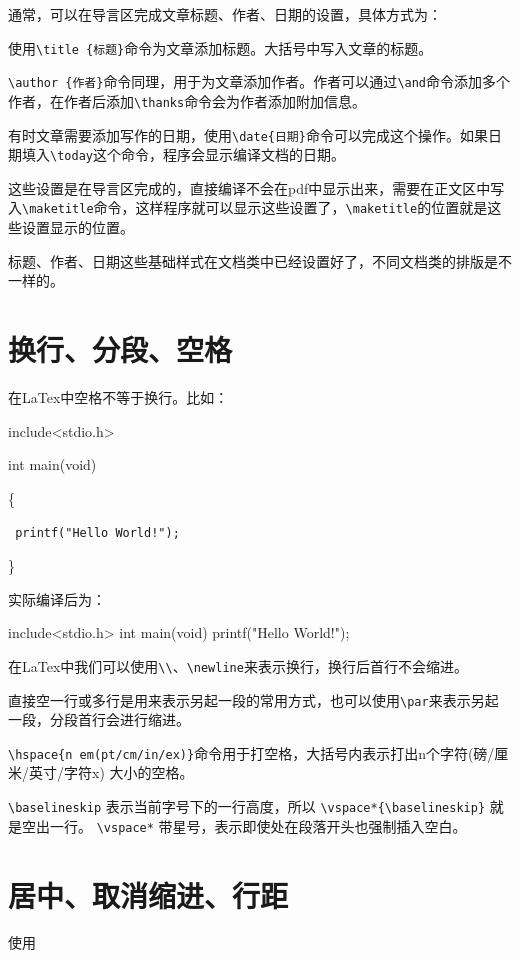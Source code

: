 \documentclass[12pt,a4paper]{ctexart}
\begin{document}
通常，可以在导言区完成文章标题、作者、日期的设置，具体方式为：

使用\texttt{\textbackslash title \{标题\}}命令为文章添加标题。大括号中写入文章的标题。

\texttt{\textbackslash author \{作者\}}命令同理，用于为文章添加作者。作者可以通过\texttt{\textbackslash and}命令添加多个作者，在作者后添加\texttt{\textbackslash thanks}命令会为作者添加附加信息。

有时文章需要添加写作的日期，使用\texttt{\textbackslash date\{日期\}}命令可以完成这个操作。如果日期填入\texttt{\textbackslash today}这个命令，程序会显示编译文档的日期。

这些设置是在导言区完成的，直接编译不会在pdf中显示出来，需要在正文区中写入\texttt{\textbackslash maketitle}命令，这样程序就可以显示这些设置了，\texttt{\textbackslash maketitle}的位置就是这些设置显示的位置。

标题、作者、日期这些基础样式在文档类中已经设置好了，不同文档类的排版是不一样的。


\section{换行、分段、空格}
在LaTex中空格不等于换行。比如：

include<stdio.h>

int main(void)

\{

\texttt{  printf("Hello World!");}

\}

实际编译后为：

include<stdio.h>
int main(void)
{
printf("Hello World!");
}

在LaTex中我们可以使用\texttt{\textbackslash \textbackslash}、\texttt{\textbackslash newline}来表示换行，换行后首行不会缩进。

直接空一行或多行是用来表示另起一段的常用方式，也可以使用\texttt{\textbackslash par}来表示另起一段，分段首行会进行缩进。

\texttt{\textbackslash hspace\{n em(pt/cm/in/ex)\}}\allowbreak 命令用于打空格，大括号内表示打出n个字符(磅/厘米/英寸/字符x) 大小的空格。

\texttt{\textbackslash baselineskip} 表示当前字号下的一行高度，所以 \texttt{\textbackslash vspace*\{\textbackslash baselineskip\}} 就是空出一行。
\texttt{\textbackslash vspace*} 带星号，表示即使处在段落开头也强制插入空白。


\section{居中、取消缩进、行距}
使用
\end{document}
